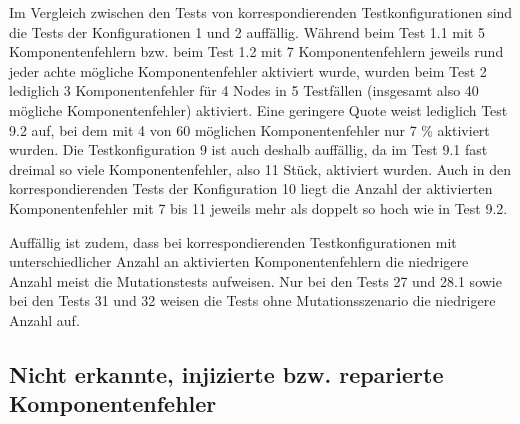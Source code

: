 Im Vergleich zwischen den Tests von korrespondierenden Testkonfigurationen sind die Tests der Konfigurationen 1 und 2 auffällig.
Während beim Test 1.1 mit 5 Komponentenfehlern bzw. beim Test 1.2 mit 7 Komponentenfehlern jeweils rund jeder achte mögliche Komponentenfehler aktiviert wurde, wurden beim Test 2 lediglich 3 Komponentenfehler für 4 Nodes in 5 Testfällen (insgesamt also 40 mögliche Komponentenfehler) aktiviert.
Eine geringere Quote weist lediglich Test 9.2 auf, bei dem mit 4 von 60 möglichen Komponentenfehler nur 7 \% aktiviert wurden.
Die Testkonfiguration 9 ist auch deshalb auffällig, da im Test 9.1 fast dreimal so viele Komponentenfehler, also 11 Stück, aktiviert wurden.
Auch in den korrespondierenden Tests der Konfiguration 10 liegt die Anzahl der aktivierten Komponentenfehler mit 7 bis 11 jeweils mehr als doppelt so hoch wie in Test 9.2.

Auffällig ist zudem, dass bei korrespondierenden Testkonfigurationen mit unterschiedlicher Anzahl an aktivierten Komponentenfehlern die niedrigere Anzahl meist die Mutationstests aufweisen.
Nur bei den Tests 27 und 28.1 sowie bei den Tests 31 und 32 weisen die Tests ohne Mutationsszenario die niedrigere Anzahl auf.

\subsection{Nicht erkannte, injizierte bzw. reparierte Komponentenfehler}
\label{sec:notDetectedFaults}


